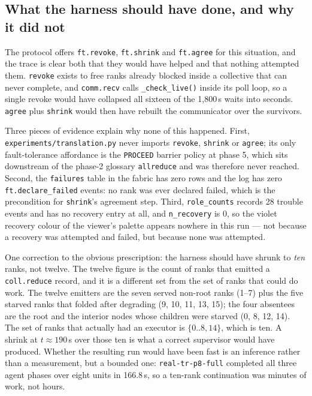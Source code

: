 \documentclass[11pt]{article}
\begin{document}
\subsection{What the harness should have done, and why it did not}
\label{sec:shrink}

The protocol offers \texttt{ft.revoke}, \texttt{ft.shrink} and \texttt{ft.agree} for this
situation, and the trace is clear both that they would have helped and that nothing
attempted them. \texttt{revoke} exists to free ranks already blocked inside a collective
that can never complete, and \texttt{comm.recv} calls \texttt{\_check\_live()} inside its
poll loop, so a single revoke would have collapsed all sixteen of the 1{,}800\,s waits
into seconds. \texttt{agree} plus \texttt{shrink} would then have rebuilt the
communicator over the survivors.

Three pieces of evidence explain why none of this happened. First,
\texttt{experiments/translation.py} never imports \texttt{revoke}, \texttt{shrink} or
\texttt{agree}; its only fault-tolerance affordance is the \texttt{PROCEED} barrier
policy at phase 5, which sits downstream of the phase-2 glossary
\texttt{allreduce} and was therefore never reached. Second, the \texttt{failures} table
in the fabric has zero rows and the log has zero \texttt{ft.declare\_failed} events: no
rank was ever declared failed, which is the precondition for \texttt{shrink}'s agreement
step. Third, \texttt{role\_counts} records 28 trouble events and has no recovery entry at
all, and \texttt{n\_recovery} is 0, so the violet recovery colour of the viewer's palette
appears nowhere in this run --- not because a recovery was attempted and failed, but
because none was attempted.

One correction to the obvious prescription: the harness should have shrunk to \emph{ten}
ranks, not twelve. The twelve figure is the count of ranks that emitted a
\texttt{coll.reduce} record, and it is a different set from the set of ranks that could
do work. The twelve emitters are the seven served non-root ranks (1--7) plus the five
starved ranks that folded after degrading (9, 10, 11, 13, 15); the four absentees are the
root and the interior nodes whose children were starved (0, 8, 12, 14). The set of ranks
that actually had an executor is $\{0..8, 14\}$, which is ten. A shrink at $t\approx190$\,s
over those ten is what a correct supervisor would have produced. Whether the resulting run
would have been fast is an inference rather than a measurement, but a bounded one:
\texttt{real-tr-p8-full} completed all three agent phases over eight units in 166.8\,s,
so a ten-rank continuation was minutes of work, not hours.
\end{document}

